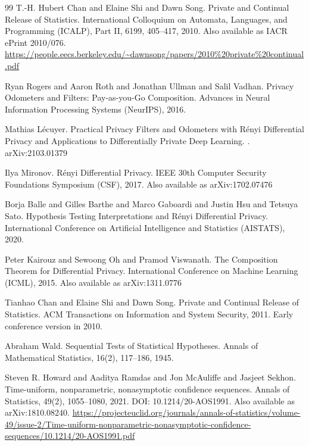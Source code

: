 \documentclass[11pt]{article}
\begin{document}
\begin{thebibliography}{99}
T.-H. Hubert Chan and Elaine Shi and Dawn Song.
\newblock Private and Continual Release of Statistics.
\newblock International Colloquium on Automata, Languages, and Programming (ICALP), Part {II}, 6199, 405--417, 2010.
\newblock Also available as IACR ePrint 2010/076.
\newblock \url{https://people.eecs.berkeley.edu/~dawnsong/papers/2010%20private%20continual.pdf}

Ryan Rogers and Aaron Roth and Jonathan Ullman and Salil Vadhan.
\newblock Privacy Odometers and Filters: Pay-as-you-Go Composition.
\newblock Advances in Neural Information Processing Systems (NeurIPS), 2016.

Mathias L{\'e}cuyer.
\newblock Practical Privacy Filters and Odometers with R{\'e}nyi Differential Privacy and Applications to Differentially Private Deep Learning.
.
\newblock arXiv:2103.01379

Ilya Mironov.
\newblock R{\'e}nyi Differential Privacy.
 IEEE 30th Computer Security Foundations Symposium (CSF), 2017.
\newblock Also available as arXiv:1702.07476

Borja Balle and Gilles Barthe and Marco Gaboardi and Justin Hsu and Tetsuya Sato.
\newblock Hypothesis Testing Interpretations and R{\'e}nyi Differential Privacy.
\newblock International Conference on Artificial Intelligence and Statistics (AISTATS), 2020.

Peter Kairouz and Sewoong Oh and Pramod Viswanath.
\newblock The Composition Theorem for Differential Privacy.
\newblock International Conference on Machine Learning (ICML), 2015.
\newblock Also available as arXiv:1311.0776

Tianhao Chan and Elaine Shi and Dawn Song.
\newblock Private and Continual Release of Statistics.
\newblock ACM Transactions on Information and System Security, 2011.
\newblock Early conference version in 2010.

Abraham Wald.
\newblock Sequential Tests of Statistical Hypotheses.
\newblock Annals of Mathematical Statistics, 16(2), 117--186, 1945.

Steven R. Howard and Aaditya Ramdas and Jon McAuliffe and Jasjeet Sekhon.
\newblock Time-uniform, nonparametric, nonasymptotic confidence sequences.
\newblock Annals of Statistics, 49(2), 1055--1080, 2021.
\newblock DOI: 10.1214/20-AOS1991.
\newblock Also available as arXiv:1810.08240.
\newblock \url{https://projecteuclid.org/journals/annals-of-statistics/volume-49/issue-2/Time-uniform-nonparametric-nonasymptotic-confidence-sequences/10.1214/20-AOS1991.pdf}


\end{thebibliography}
\end{document}
